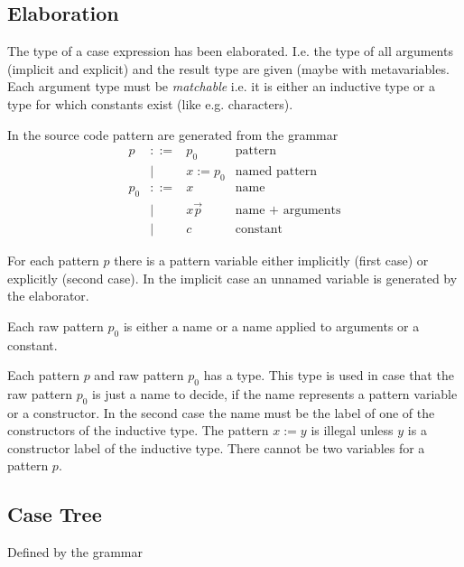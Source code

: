 \subsection{Elaboration}

The type of a case expression has been elaborated. I.e. the type of all
arguments (implicit and explicit) and the result type are given (maybe with
metavariables. Each argument type must be \emph{matchable} i.e. it is either an
inductive type or a type for which constants exist (like e.g. characters).

In the source code pattern are generated from the grammar
$$
\begin{array}{llll}
    p     &::=&  p_0          & \text{pattern}
    \\
          &\mid& x := p_0     & \text{named pattern}
    \\
    p_0   &::=&  x            & \text{name}
    \\
          &\mid& x \vec p     & \text{name + arguments}
    \\
          &\mid& c            & \text{constant}
\end{array}
$$

For each pattern $p$ there is a pattern variable either implicitly (first case)
or explicitly (second case). In the implicit case an unnamed variable is
generated by the elaborator.

Each raw pattern $p_0$ is either a name or a name applied to arguments or a
constant.

Each pattern $p$ and raw pattern $p_0$ has a type. This type is used in case
that the raw pattern $p_0$ is just a name to decide, if the name represents a
pattern variable or a constructor. In the second case the name must be the label
of one of the constructors of the inductive type. The pattern $x := y$ is
illegal unless $y$ is a constructor label of the inductive type. There cannot be
two variables for a pattern $p$.






\subsection{Case Tree}


Defined by the grammar

